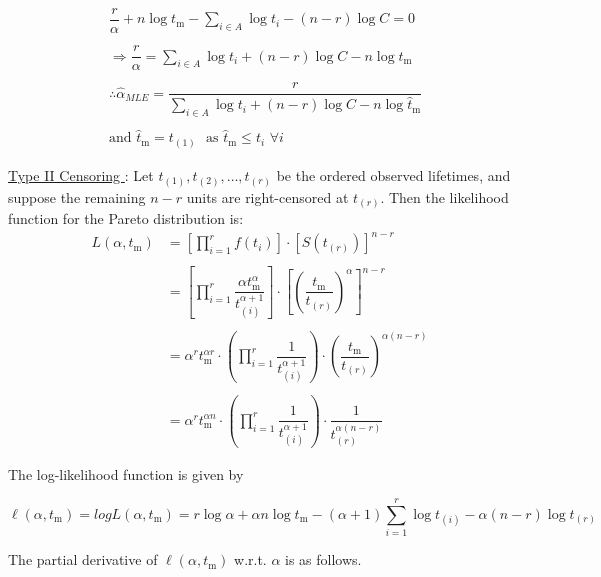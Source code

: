 \documentclass[12pt, a4paper, onecolumn, answers]{exam}
\begin{document}
\begin{questions}
\begin{solution}
\begin{align*}
&\dfrac{r}{\alpha} + n \log t_{\mathrm{m}} 
   - \sum_{i \in A} \log t_i 
   - (n - r) \log C = 0 \\
\\
&\Rightarrow \dfrac{r}{\alpha} 
   = \sum_{i \in A} \log t_i + (n - r) \log C - n \log t_{\mathrm{m}} \\
\\
&\therefore \hat{\alpha}_{MLE}
   = \dfrac{r}{\sum\limits_{i \in A} \log t_i + (n - r) \log C - n \log \hat{t}_{\mathrm{m}}}\\
\\ &\text{and } \hat{t}_{\mathrm{m}} = t_{(1)} \,\,\,\, \text{as } \hat{t}_{\mathrm{m}} \leq t_i \,\, \forall i
\end{align*}

\newpage

\leftpointright \hspace{0.1cm} \underline{Type II Censoring } : Let \( t_{(1)}, t_{(2)}, \dots, t_{(r)} \) be the ordered observed lifetimes, and suppose the remaining \( n - r \) units are right-censored at \( t_{(r)} \). Then the likelihood function for the Pareto distribution is:
\begin{align*}
L(\alpha, t_{\mathrm{m}}) &= 
\left[ \prod_{i=1}^{r} f(t_i) \right] 
\cdot 
\left[ S(t_{(r)}) \right]^{n - r} \\
\\
&= \left[ \prod_{i=1}^{r} \dfrac{\alpha t_{\mathrm{m}}^{\alpha}}{t_{(i)}^{\alpha + 1}} \right]
\cdot 
\left[ \left( \dfrac{t_{\mathrm{m}}}{t_{(r)}} \right)^{\alpha} \right]^{n - r} \\
\\
&= \alpha^r t_{\mathrm{m}}^{\alpha r} 
\cdot 
\left( \prod_{i=1}^{r} \dfrac{1}{t_{(i)}^{\alpha + 1}} \right) 
\cdot 
\left( \dfrac{t_{\mathrm{m}}}{t_{(r)}} \right)^{\alpha(n - r)} \\
\\
&= 
\alpha^r t_{\mathrm{m}}^{\alpha n} 
\cdot 
\left( \prod_{i=1}^{r} \dfrac{1}{t_{(i)}^{\alpha + 1}} \right) 
\cdot 
\dfrac{1}{t_{(r)}^{\alpha(n - r)}}
\end{align*}

The log-likelihood function is given by

$$\ell(\alpha, t_{\mathrm{m}}) = log L(\alpha, t_{\mathrm{m}}) = r \log \alpha + \alpha n \log t_{\mathrm{m}} - (\alpha + 1) \sum_{i=1}^{r} \log t_{(i)} - \alpha(n - r) \log t_{(r)}$$

The partial derivative of $\ell(\alpha, t_\mathrm{m})$ w.r.t. $\alpha$ is as follows.


\end{solution}
\end{questions}
\end{document}
